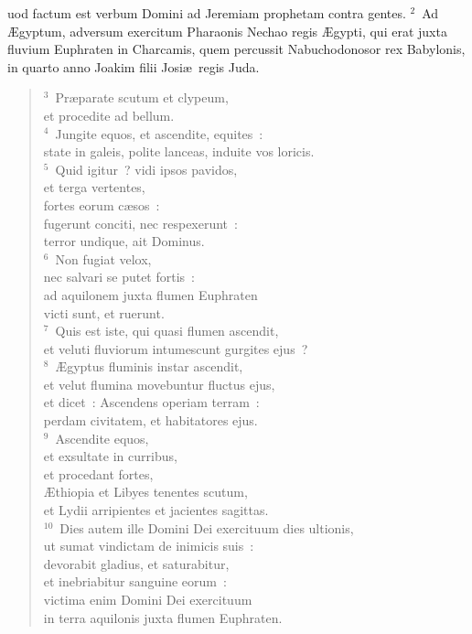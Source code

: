 \bchapter
{}uod factum est verbum Domini ad Jeremiam prophetam contra gentes.
${}^{2}$~Ad \AE gyptum, adversum exercitum Pharaonis Nechao regis \AE gypti, qui erat juxta fluvium Euphraten in Charcamis, quem percussit Nabuchodonosor rex Babylonis, in quarto anno Joakim filii Josi\ae\ regis Juda.
\begin{flushleft}\begin{verse}${}^{3}$~Pr\ae parate scutum et clypeum,\\ et procedite ad bellum.\\
${}^{4}$~Jungite equos, et ascendite, equites~:\\ state in galeis, polite lanceas, induite vos loricis.\\
${}^{5}$~Quid igitur~? vidi ipsos pavidos,\\ et terga vertentes,\\ fortes eorum c\ae sos~:\\ fugerunt conciti, nec respexerunt~:\\ terror undique, ait Dominus.\\
${}^{6}$~Non fugiat velox,\\ nec salvari se putet fortis~:\\ ad aquilonem juxta flumen Euphraten\\ victi sunt, et ruerunt.\\
${}^{7}$~Quis est iste, qui quasi flumen ascendit,\\ et veluti fluviorum intumescunt gurgites ejus~?\\
${}^{8}$~\AE gyptus fluminis instar ascendit,\\ et velut flumina movebuntur fluctus ejus,\\ et dicet~: Ascendens operiam terram~:\\ perdam civitatem, et habitatores ejus.\\
${}^{9}$~Ascendite equos,\\ et exsultate in curribus,\\ et procedant fortes,\\ \AE thiopia et Libyes tenentes scutum,\\ et Lydii arripientes et jacientes sagittas.\\
${}^{10}$~Dies autem ille Domini Dei exercituum dies ultionis,\\ ut sumat vindictam de inimicis suis~:\\ devorabit gladius, et saturabitur,\\ et inebriabitur sanguine eorum~:\\ victima enim Domini Dei exercituum\\ in terra aquilonis juxta flumen Euphraten.\\

\end{verse}
\end{flushleft}
